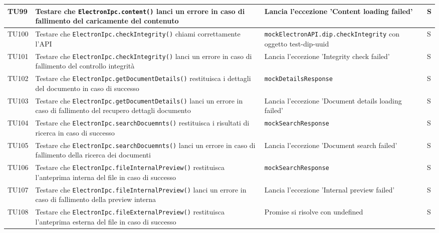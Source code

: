 \documentclass[a4paper,12pt]{article}
\begin{document}
\begin{longtable}{|M{1.2cm}|M{5cm}|M{7cm}|M{1.5cm}|}
            TU99 & Testare che \texttt{ElectronIpc.content()} lanci un errore in caso di fallimento del caricamente del contenuto & Lancia l'eccezione 'Content loading failed' & S \\
            \hline

            TU100 & Testare che \texttt{ElectronIpc.checkIntegrity()} chiami correttamente l'API & \texttt{mockElectronAPI.dip.checkIntegrity} con oggetto test-dip-uuid & S \\
            \hline

            TU101 & Testare che \texttt{ElectronIpc.checkIntegrity()} lanci un errore in caso di fallimento del controllo integrità & Lancia l'eccezione 'Integrity check failed' & S \\
            \hline

            TU102 & Testare che \texttt{ElectronIpc.getDocumentDetails()} restituisca i dettagli del documento in caso di successo & \texttt{mockDetailsResponse}  & S \\
            \hline

            TU103 & Testare che \texttt{ElectronIpc.getDocumentDetails()} lanci un errore in caso di fallimento del recupero dettagli documento & Lancia l'eccezione 'Document details loading failed' & S \\
            \hline

            TU104 & Testare che \texttt{ElectronIpc.searchDocuemnts()} restituisca i risultati di ricerca in caso di successo & \texttt{mockSearchResponse} & S \\
            \hline

            TU105 & Testare che \texttt{ElectronIpc.searchDocuemnts()} lanci un errore in caso di fallimento della ricerca dei documenti & Lancia l'eccezione 'Document search failed' & S \\
            \hline

            TU106 & Testare che \texttt{ElectronIpc.fileInternalPreview()} restituisca l'anteprima interna del file in caso di successo & \texttt{mockSearchResponse} & S \\
            \hline

            TU107 & Testare che \texttt{ElectronIpc.fileInternalPreview()} lanci un errore in caso di fallimento della preview interna & Lancia l'eccezione 'Internal preview failed' & S \\
            \hline

            TU108 & Testare che \texttt{ElectronIpc.fileExternalPreview()} restituisca l'anteprima esterna del file in caso di successo & Promise si risolve con undefined & S \\
            \hline


\end{longtable}
\end{document}
